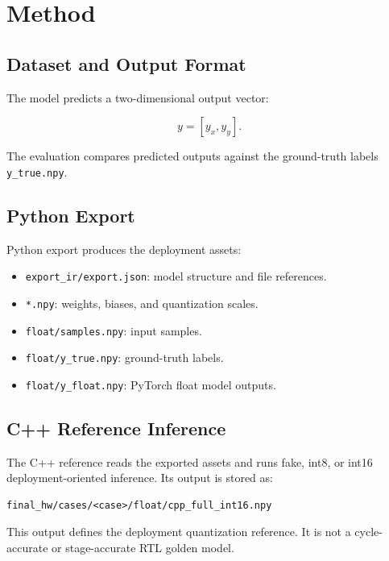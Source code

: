 \chapter{Method}
\label{ch:method}

\section{Dataset and Output Format}

The model predicts a two-dimensional output vector:

\begin{equation}
  y = [y_x, y_y].
\end{equation}

The evaluation compares predicted outputs against the ground-truth labels \texttt{y\_true.npy}.

\section{Python Export}

Python export produces the deployment assets:

\begin{itemize}
  \item \texttt{export\_ir/export.json}: model structure and file references.
  \item \texttt{*.npy}: weights, biases, and quantization scales.
  \item \texttt{float/samples.npy}: input samples.
  \item \texttt{float/y\_true.npy}: ground-truth labels.
  \item \texttt{float/y\_float.npy}: PyTorch float model outputs.
\end{itemize}

\section{C++ Reference Inference}

The C++ reference reads the exported assets and runs fake, int8, or int16 deployment-oriented inference. Its output is stored as:

\begin{lstlisting}
final_hw/cases/<case>/float/cpp_full_int16.npy
\end{lstlisting}

This output defines the deployment quantization reference. It is not a cycle-accurate or stage-accurate RTL golden model.

